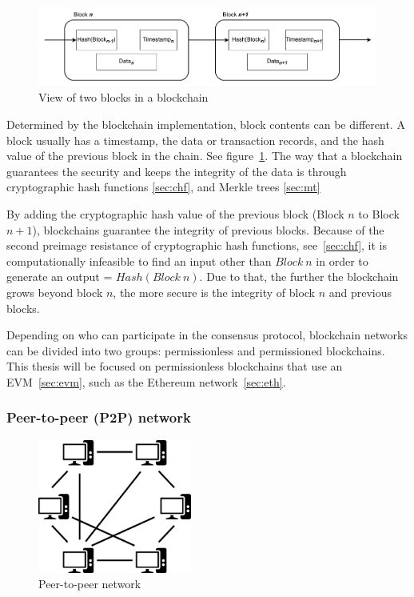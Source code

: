 \documentclass[11pt,a4paper]{report}
\begin{document}
\begin{figure}[htp]
	\centering
	\includegraphics[width=1\textwidth]{./images/bc}
	\caption{View of two blocks in a blockchain}
	\label{fig:bc}
\end{figure}

Determined by the blockchain implementation, block contents can be different. A block usually has a timestamp, the data or transaction records, and the hash value of the previous block in the chain. See figure~\ref{fig:bc}.
The way that a blockchain guarantees the security and keeps the integrity of the data is through cryptographic hash functions \ref{sec:chf}, and Merkle trees \ref{sec:mt}

By adding the cryptographic hash value of the previous block (Block $n$ to Block $n+1$), blockchains guarantee the integrity of previous blocks. Because of the second preimage resistance of cryptographic hash functions, see~\ref{sec:chf}, it is computationally infeasible to find an input other than $Block~n$ in order to generate an output = $Hash (Block~n)$. Due to that, the further the blockchain grows beyond block $n$, the more secure is the integrity of block $n$ and previous blocks.

Depending on who can participate in the consensus protocol, blockchain networks can be divided into two groups: permissionless and permissioned blockchains. This thesis will be focused on permissionless blockchains that use an EVM~\ref{sec:evm}, such as the Ethereum network~\ref{sec:eth}.

\subsubsection{Peer-to-peer (P2P) network}\label{subsec:p2p}
\begin{figure}[htp]
	\centering
	\includegraphics[width=0.45\textwidth]{./images/p2p}
	\caption{Peer-to-peer network\cite{wiki:Peer-to-peer}}
	\label{fig:p2p}
\end{figure}
\end{document}
